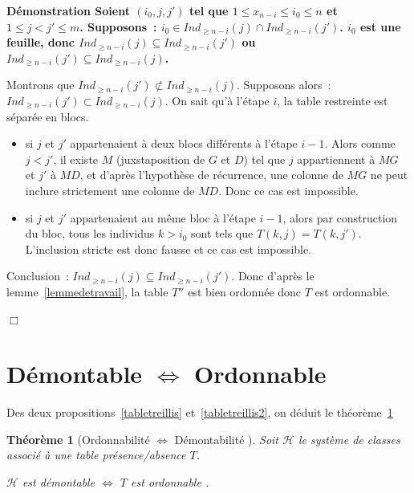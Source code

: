 \documentclass[a4paper]{report}
\renewcommand{\textbf}[1]{\begingroup\bfseries\mathversion{bold}#1\endgroup}
\newtheorem{theorem}{Théorème}[chapter]
\newenvironment{preuve}{\textbf{Démonstration}}{}
\begin{document}
\begin{preuve}
Soient $(i_0, j, j')$ tel que $1 \leqslant x_{n - i} \leqslant i_0 \leqslant n$ et $1 \leqslant j < j' \leqslant m $.
Supposons~: $i_0 \in Ind_{\geqslant n - i}(j) \cap Ind_{\geqslant n - i}(j')$.
$i_0$ est une feuille, donc $Ind_{\geqslant n - i}(j) \subseteq Ind_{\geqslant n - i}(j')$ ou 
$Ind_{\geqslant n - i}(j') \subseteq Ind_{\geqslant n - i}(j)$.

Montrons que $Ind_{\geqslant n - i}(j')  \not\subset Ind_{\geqslant n - i}(j)$.
Supposons alors~: $Ind_{\geqslant n - i}(j') \subset Ind_{\geqslant n - i}(j)$.
On sait qu'à l'étape $i$, la table restreinte est séparée en blocs.
\begin{itemize}
 \item si $j$ et $j'$ appartenaient à deux blocs différents à l'étape $i - 1$.
Alors comme $j < j'$, il existe $M$ (juxstaposition de $G$ et $D$) tel que $j$ appartiennent à $MG$ et $j'$ à $MD$, 
et d'après l'hypothèse de récurrence, une colonne de $MG$ ne peut inclure strictement une colonne de $MD$. 
Donc ce cas est impossible. 
 \item si $j$ et $j'$ appartenaient au m\^eme bloc à l'étape $i - 1$,
alors par construction du bloc, tous les individus $k > i_0$ sont tels que $T(k, j) = T(k, j')$.
L'inclusion stricte est donc fausse et ce cas est impossible.
\end{itemize}

Conclusion~: $Ind_{\geqslant n - i}(j) \subseteq Ind_{\geqslant n - i}(j')$. 
Donc d'après le lemme~\ref{lemmedetravail}, la table $T''$ est bien ordonnée donc $T$ est ordonnable. 

$\Box$
\end{preuve}


\section{Démontable $\Leftrightarrow$ Ordonnable}


Des deux propositions~\ref{tabletreillis} et~\ref{tabletreillis2}, on déduit le théorème~\ref{tabletreillistheo}

\begin{theorem}[Ordonnabilité $\Leftrightarrow$ Démontabilité ]

\label{tabletreillistheo}
Soit $\mathcal{H}$ le système de classes associé à une table présence/absence $T$.

$\mathcal{H}$ est démontable $\Leftrightarrow$ $T$ est ordonnable .  

\end{theorem}
\end{document}
